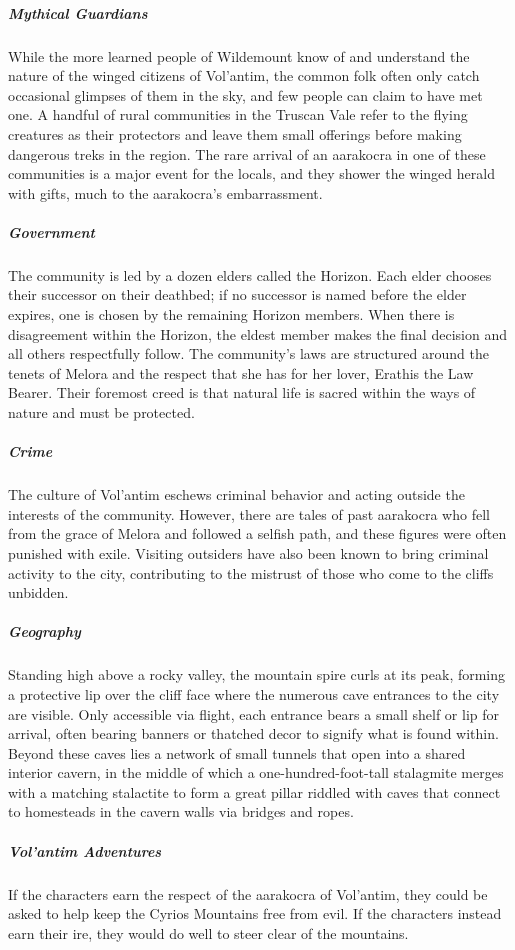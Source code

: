 \documentclass[10pt,a4paper,twoside,bg=print,twocolumn,openany,nodeprecatedcode]{dndbook}
\begin{document}
\subparagraph{Mythical Guardians}
While the more learned people of Wildemount know of and understand the nature of the winged citizens of Vol'antim, the common folk often only catch occasional glimpses of them in the sky, and few people can claim to have met one. A handful of rural communities in the Truscan Vale refer to the flying creatures as their protectors and leave them small offerings before making dangerous treks in the region. The rare arrival of an aarakocra in one of these communities is a major event for the locals, and they shower the winged herald with gifts, much to the aarakocra's embarrassment.

\subparagraph{Government}
The community is led by a dozen elders called the Horizon. Each elder chooses their successor on their deathbed; if no successor is named before the elder expires, one is chosen by the remaining Horizon members. When there is disagreement within the Horizon, the eldest member makes the final decision and all others respectfully follow. The community's laws are structured around the tenets of Melora and the respect that she has for her lover, Erathis the Law Bearer. Their foremost creed is that natural life is sacred within the ways of nature and must be protected.

\subparagraph{Crime}
The culture of Vol'antim eschews criminal behavior and acting outside the interests of the community. However, there are tales of past aarakocra who fell from the grace of Melora and followed a selfish path, and these figures were often punished with exile. Visiting outsiders have also been known to bring criminal activity to the city, contributing to the mistrust of those who come to the cliffs unbidden.

\subparagraph{Geography}
Standing high above a rocky valley, the mountain spire curls at its peak, forming a protective lip over the cliff face where the numerous cave entrances to the city are visible. Only accessible via flight, each entrance bears a small shelf or lip for arrival, often bearing banners or thatched decor to signify what is found within. Beyond these caves lies a network of small tunnels that open into a shared interior cavern, in the middle of which a one-hundred-foot-tall stalagmite merges with a matching stalactite to form a great pillar riddled with caves that connect to homesteads in the cavern walls via bridges and ropes.

\subparagraph{Vol'antim Adventures}
If the characters earn the respect of the aarakocra of Vol'antim, they could be asked to help keep the Cyrios Mountains free from evil. If the characters instead earn their ire, they would do well to steer clear of the mountains.
\end{document}
